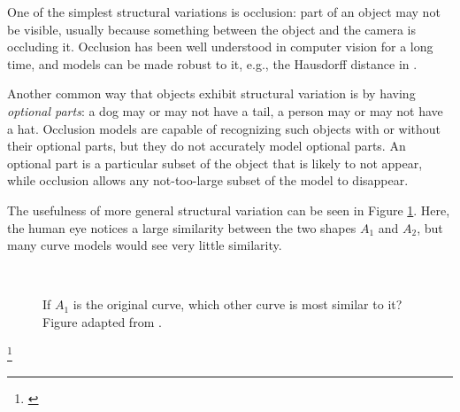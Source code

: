 One of the simplest structural variations is occlusion: part of an
object may not be visible, usually because something between the
object and the camera is occluding it. Occlusion has been well
understood in computer vision for a long time, and models can be made
robust to it, e.g., the Hausdorff distance in \cite{hausdorff}. 

Another common way that objects exhibit structural variation is by
having \emph{optional parts}: a dog may or may not have a tail, a
person may or may not have a hat. Occlusion models are capable of
recognizing such objects with or without their optional parts, but
they do not accurately model optional parts. An optional part is a
particular subset of the object that is likely to not appear, while
occlusion allows any not-too-large subset of the model to disappear.

The usefulness of more general structural variation can be seen in
Figure \ref{fig-variation}. Here, the human eye notices a large
similarity between the two shapes $A_1$ and $A_2$, but many curve
models would see very little similarity.

\begin{figure}
  \centering
{}
\\
\caption{If $A_1$ is the original curve, which other curve is most
  similar to it? Figure adapted from .}
\label{fig-variation}
\end{figure}
\footnote{\cite{basri-jacobs}}

